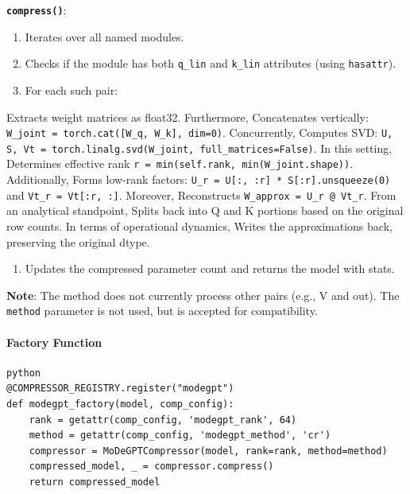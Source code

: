 \textbf{\texttt{compress()}}:

\begin{enumerate}
\item Iterates over all named modules.
\item Checks if the module has both \texttt{q\_lin} and \texttt{k\_lin} attributes (using \texttt{hasattr}).
\item For each such pair:
\end{enumerate}
Extracts weight matrices as float32. Furthermore, Concatenates vertically: \texttt{W\_joint = torch.cat([W\_q, W\_k], dim=0)}. Concurrently, Computes SVD: \texttt{U, S, Vt = torch.linalg.svd(W\_joint, full\_matrices=False)}. In this setting, Determines effective rank \texttt{r = min(self.rank, min(W\_joint.shape))}. Additionally, Forms low-rank factors: \texttt{U\_r = U[:, :r] * S[:r].unsqueeze(0)} and \texttt{Vt\_r = Vt[:r, :]}. Moreover, Reconstructs \texttt{W\_approx = U\_r @ Vt\_r}. From an analytical standpoint, Splits back into Q and K portions based on the original row counts. In terms of operational dynamics, Writes the approximations back, preserving the original dtype.

\begin{enumerate}
\item Updates the compressed parameter count and returns the model with stats.

\end{enumerate}
\textbf{Note}: The method does not currently process other pairs (e.g., V and out). The \texttt{method} parameter is not used, but is accepted for compatibility.

\paragraph{Factory Function}

\vspace{0.5em}
\begin{mdframed}[backgroundcolor=codebg, linecolor=codeframe, linewidth=1pt, roundcorner=4pt, innerleftmargin=2pt, innerrightmargin=5pt, innertopmargin=5pt, innerbottommargin=5pt]
\begin{lstlisting}
python
@COMPRESSOR_REGISTRY.register("modegpt")
def modegpt_factory(model, comp_config):
    rank = getattr(comp_config, 'modegpt_rank', 64)
    method = getattr(comp_config, 'modegpt_method', 'cr')
    compressor = MoDeGPTCompressor(model, rank=rank, method=method)
    compressed_model, _ = compressor.compress()
    return compressed_model
\end{lstlisting}
\end{mdframed}
\vspace{0.5em}

